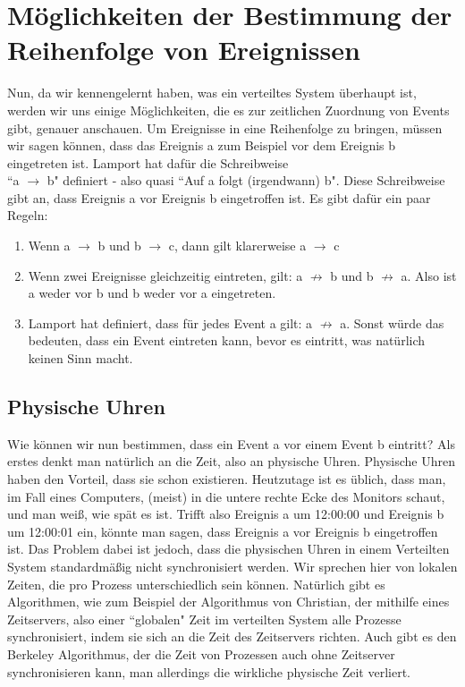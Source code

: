 \documentclass[a4paper,11pt]{report}
\begin{document}
\chapter{Möglichkeiten der Bestimmung der Reihenfolge von Ereignissen}
Nun, da wir kennengelernt haben, was ein verteiltes System überhaupt ist, werden wir uns einige Möglichkeiten, die es zur zeitlichen Zuordnung von Events gibt, genauer anschauen. Um Ereignisse in eine Reihenfolge zu bringen, müssen wir sagen können, dass das Ereignis a zum Beispiel vor dem Ereignis b eingetreten ist. Lamport hat dafür die Schreibweise\\``a $\rightarrow$ b" definiert - also quasi ``Auf a folgt (irgendwann) b". Diese Schreibweise gibt an, dass Ereignis a vor Ereignis b eingetroffen ist. Es gibt dafür ein paar Regeln:
\begin{enumerate}
	\item Wenn a $\rightarrow$ b und b $\rightarrow$ c, dann gilt klarerweise a $\rightarrow$ c
	\item Wenn zwei Ereignisse gleichzeitig eintreten, gilt: a $\nrightarrow$ b und b $\nrightarrow$ a. Also ist a weder vor b und b weder vor a eingetreten.
	\item Lamport hat definiert, dass für jedes Event a gilt: a $\nrightarrow$ a. Sonst würde das bedeuten, dass ein Event eintreten kann, bevor es eintritt, was natürlich keinen Sinn macht.
\end{enumerate}

\section{Physische Uhren}
Wie können wir nun bestimmen, dass ein Event a vor einem Event b eintritt? Als erstes denkt man natürlich an die Zeit, also an physische Uhren. Physische Uhren haben den Vorteil, dass sie schon existieren. Heutzutage ist es üblich, dass man, im Fall eines Computers, (meist) in die untere rechte Ecke des Monitors schaut, und man weiß, wie spät es ist. Trifft also Ereignis a um 12:00:00 und Ereignis b um 12:00:01 ein, könnte man sagen, dass Ereignis a vor Ereignis b eingetroffen ist. Das Problem dabei ist jedoch, dass die physischen Uhren in einem Verteilten System standardmäßig nicht synchronisiert werden. Wir sprechen hier von lokalen Zeiten, die pro Prozess unterschiedlich sein können. Natürlich gibt es Algorithmen, wie zum Beispiel der Algorithmus von Christian, der mithilfe eines Zeitservers, also einer ``globalen" Zeit im verteilten System alle Prozesse synchronisiert, indem sie sich an die Zeit des Zeitservers richten. Auch gibt es den Berkeley Algorithmus, der die Zeit von Prozessen auch ohne Zeitserver synchronisieren kann, man allerdings die wirkliche physische Zeit verliert.
\end{document}
